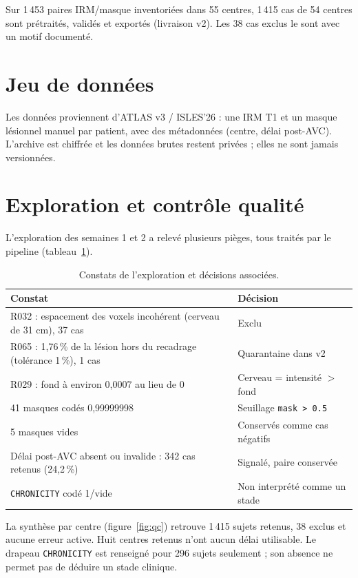 \documentclass[11pt,a4paper]{report}
\newcommand{\fichier}[1]{\texttt{#1}}
\begin{document}
Sur 1\,453 paires IRM/masque inventoriées dans 55 centres, 1\,415 cas de 54
centres sont prétraités, validés et exportés (livraison v2). Les 38 cas
exclus le sont avec un motif documenté.

\section{Jeu de données}

Les données proviennent d'ATLAS v3 / ISLES'26 : une IRM T1 et un masque
lésionnel manuel par patient, avec des métadonnées (centre, délai
post-AVC). L'archive est chiffrée et les données brutes restent privées ;
elles ne sont jamais versionnées.

\section{Exploration et contrôle qualité}

L'exploration des semaines 1 et 2 a relevé plusieurs pièges, tous traités par
le pipeline (tableau~\ref{tab:qc}).

\begin{table}[H]
  \centering
  \caption{Constats de l'exploration et décisions associées.}
  \label{tab:qc}
  \begin{tabularx}{\textwidth}{Xl}
    \toprule
    \textbf{Constat} & \textbf{Décision} \\
    \midrule
    R032 : espacement des voxels incohérent (cerveau de 31 cm), 37 cas & Exclu \\
    R065 : 1,76\,\% de la lésion hors du recadrage (tolérance 1\,\%), 1 cas & Quarantaine dans v2 \\
    R029 : fond à environ 0,0007 au lieu de 0 & Cerveau = intensité $>$ fond \\
    41 masques codés 0,99999998 & Seuillage \fichier{mask > 0.5} \\
    5 masques vides & Conservés comme cas négatifs \\
    Délai post-AVC absent ou invalide : 342 cas retenus (24,2\,\%) & Signalé, paire conservée \\
    \fichier{CHRONICITY} codé 1/vide & Non interprété comme un stade \\
    \bottomrule
  \end{tabularx}
\end{table}

La synthèse par centre (figure~\ref{fig:qc}) retrouve 1\,415 sujets retenus,
38 exclus et aucune erreur active. Huit centres retenus n'ont aucun délai
utilisable. Le drapeau \fichier{CHRONICITY} est renseigné pour 296 sujets
seulement ; son absence ne permet pas de déduire un stade clinique.
\end{document}
